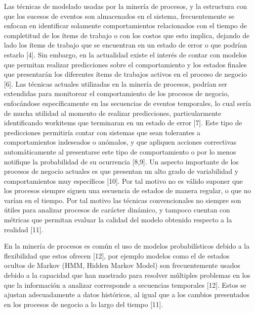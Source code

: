 Las técnicas de modelado usadas por la minería de procesos, y la estructura con que los sucesos de eventos son almacenados en el sistema, frecuentemente se enfocan en identificar solamente comportamientos relacionados con el tiempo de completitud de los ítems de trabajo o con los costos que esto implica, dejando de lado los ítems de trabajo que se encuentran en un estado de error o que podrían estarlo [4]. Sin embargo, en la actualidad existe el interés de contar con modelos que permitan realizar predicciones sobre el comportamiento y los estados finales que presentarán los diferentes ítems de trabajos activos en el proceso de negocio [6]. 
Las técnicas actuales utilizadas en la minería de procesos, podrían ser extendidas para monitorear el comportamiento de los procesos de negocio, enfocándose específicamente en las secuencias de eventos temporales, lo cual sería de mucha utilidad al momento de realizar predicciones, particularmente identificando workitems que terminaran en un estado de error [7]. Este tipo de predicciones permitiría contar con sistemas que sean tolerantes a comportamientos indeseados o anómalos, y que apliquen acciones correctivas automáticamente al presentarse este tipo de comportamiento o por lo menos notifique la probabilidad de su ocurrencia [8,9].
Un aspecto importante de los procesos de negocio actuales es que presentan un alto grado de variabilidad y comportamientos muy específicos [10]. Por tal motivo no es válido suponer que los procesos siempre siguen una secuencia de estados de manera regular, o que no varían en el tiempo. Por tal motivo las técnicas convencionales no siempre son útiles para analizar procesos de carácter dinámico, y tampoco cuentan con métricas que permitan evaluar la calidad del modelo obtenido respecto a la realidad [11].

En la minería de procesos es común el uso de modelos probabilísticos debido a la flexibilidad que estos ofrecen [12], por ejemplo modelos como el de estados ocultos de Markov (HMM, Hidden Markov Model) son frecuentemente usados debido a la capacidad que han mostrado para resolver múltiples problemas en los que la información a analizar corresponde a secuencias temporales [12]. Estos se ajustan adecuadamente a datos históricos, al igual que a los cambios presentados en los procesos de negocio a lo largo del tiempo [11].

